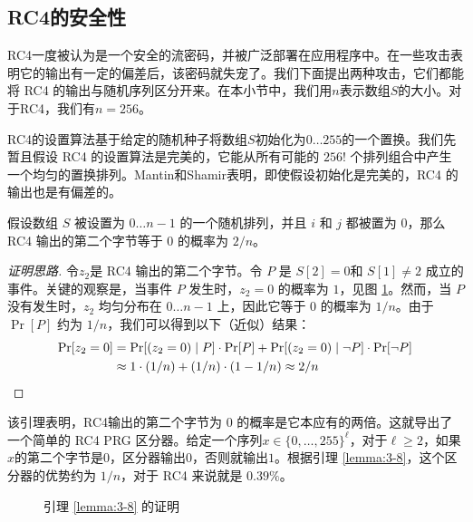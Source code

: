 \subsection{RC4的安全性}


RC4一度被认为是一个安全的流密码，并被广泛部署在应用程序中。在一些攻击表明它的输出有一定的偏差后，该密码就失宠了。我们下面提出两种攻击，它们都能将 RC4 的输出与随机序列区分开来。在本小节中，我们用$n$表示数组$S$的大小。对于RC4，我们有$n=256$。

\begin{snote}[初始 RC4 输出中的偏差。]
RC4的设置算法基于给定的随机种子将数组$S$初始化为$0 \dots 255$的一个置换。我们先暂且假设 RC4 的设置算法是完美的，它能从所有可能的 $256!$ 个排列组合中产生一个均匀的置换排列。Mantin和Shamir表明，即使假设初始化是完美的，RC4 的输出也是有偏差的。
\end{snote}

\begin{lemma}\label{lemma:3-8}
假设数组 $S$ 被设置为 $0\dots n-1$ 的一个随机排列，并且 $i$ 和 $j$ 都被置为 $0$，那么 RC4 输出的第二个字节等于 $0$ 的概率为 $2/n$。
\end{lemma}

\begin{proof}[证明思路]
令$z_2$是 RC4 输出的第二个字节。令 $P$ 是 $S[2]=0$和 $S[1]\neq2$ 成立的事件。关键的观察是，当事件 $P$ 发生时，$z_2=0$ 的概率为 $1$，见图 \ref{fig:3-13}。然而，当 $P$ 没有发生时，$z_2$ 均匀分布在 $0\dots n-1$ 上，因此它等于 $0$ 的概率为 $1/n$。由于 $\Pr[P]$ 约为 $1/n$，我们可以得到以下（近似）结果：
\[
\begin{aligned}
\Pr[z_2=0] & =\Pr[(z_2=0)\;|\;P]\cdot\Pr[P]+\Pr[(z_2=0)\;|\;\neg P]\cdot\Pr[\neg P]\\
& \approx 1\cdot(1/n)+(1/n)\cdot(1-1/n)\approx2/n \qedhere
\end{aligned}
\]
\end{proof}

该引理表明，RC4输出的第二个字节为 $0$ 的概率是它本应有的两倍。这就导出了一个简单的 RC4 PRG 区分器。给定一个序列$x\in\{0,\dots,255\}^\ell$，对于$\ell\geq2$，如果$x$的第二个字节是$0$，区分器输出$0$，否则就输出$1$。根据引理 \ref{lemma:3-8}，这个区分器的优势约为 $1/n$，对于 RC4 来说就是 $0.39\%$。

\begin{figure}
	\centering
	
	\caption{引理 \ref{lemma:3-8} 的证明}
	\label{fig:3-13}
\end{figure}

